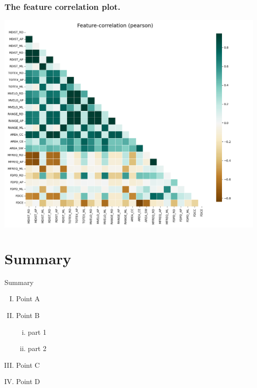 \documentclass{beamer}
\begin{document}
\begin{frame}
\frametitle{The feature correlation plot.}
\centering
\includegraphics[scale=0.3]{Manuscripts/src/figures/corr_plot.png}
\end{frame}

\section{Summary}

\begin{frame}{Summary}

\begin{enumerate}[(I)]
\item Point A
\item Point B
\begin{enumerate}[(i)]
\item part 1
\item part 2
\end{enumerate}
\item Point C
\item Point D
\end{enumerate}
    
\end{frame}



\end{document}
